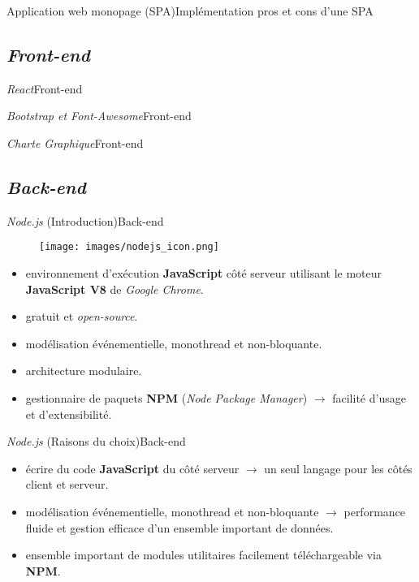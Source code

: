 \documentclass[usenames,dvipsnames]{beamer}
\begin{document}
\begin{frame}{Application web monopage (SPA)}{Implémentation}
pros et cons d'une SPA
\end{frame}

\subsection{\protect\textit{Front-end}}
\begin{frame}{\textit{React}}{Front-end}

\end{frame}

\begin{frame}{\textit{Bootstrap et Font-Awesome}}{Front-end}

\end{frame}

\begin{frame}{\textit{Charte Graphique}}{Front-end}

\end{frame}

\subsection{\protect\textit{Back-end}}
\begin{frame}{\textit{Node.js} (Introduction)}{Back-end}
  \begin{figure}[!ht]
    \texttt{[image: images/nodejs\_icon.png]}
  \end{figure}

  \begin{itemize}
    \item environnement d'exécution \textbf{JavaScript} côté serveur utilisant le moteur \textbf{JavaScript V8} de \textit{Google Chrome}.
    \item gratuit et \textit{open-source}.
    \item modélisation événementielle, monothread et non-bloquante.
    \item architecture modulaire.
    \item gestionnaire de paquets \textbf{NPM} (\textit{Node Package Manager}) $\rightarrow$ facilité d'usage et d'extensibilité.
  \end{itemize}
\end{frame}

\begin{frame}{\textit{Node.js} (Raisons du choix)}{Back-end}
  \begin{itemize}
    \item écrire du code \textbf{JavaScript} du côté serveur $\rightarrow$ un seul langage pour les côtés client et serveur.
    \item modélisation événementielle, monothread et non-bloquante $\rightarrow$ performance fluide et gestion efficace d'un ensemble important de données.
    \item ensemble important de modules utilitaires facilement téléchargeable via \textbf{NPM}.
  \end{itemize}
\end{frame}
\end{document}
